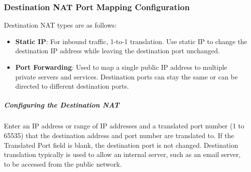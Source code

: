 \subsubsection{Destination NAT Port Mapping Configuration}
Destination NAT types are as follows:
    \begin{itemize}
        \item \textbf{Static IP}:  For inbound traffic, 1-to-1 translation. Use static IP to change the destination IP address while leaving the destination port unchanged.
        \item \textbf{Port Forwarding}:  Used to map a single public IP address to multiple private servers and services. Destination ports can stay the same or can be directed to different destination ports.
    \end{itemize}
\subparagraph{Configuring the Destination NAT} Enter an IP address or range of IP addresses and a translated port number (1 to 65535) that the destination address and port number are translated to. If the Translated Port field is blank, the destination port is not changed. Destination translation typically is used to allow an internal server, such as an email server, to be accessed from the public network.
